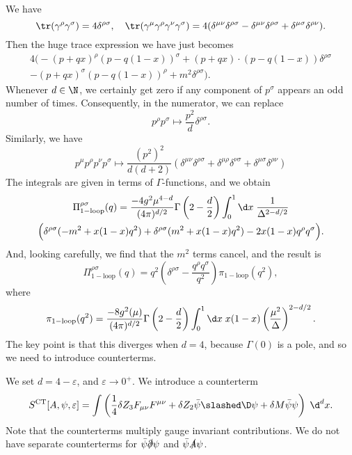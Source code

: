\documentclass[a4paper]{article}
\begin{document}
We have
\[
  \tr(\gamma^\rho \gamma^\sigma) = 4 \delta^{\rho\sigma},\quad \tr (\gamma^\mu \gamma^\rho \gamma^\nu \gamma^\sigma) = 4 (\delta^{\mu\nu}\delta^{\rho\sigma} - \delta^{\mu\nu} \delta^{\rho\sigma} + \delta^{\mu\sigma}\delta^{\rho\nu}).
\]
Then the huge trace expression we have just becomes
\begin{multline*}
  4\Big(-(p + qx)^\rho (p - q(1 - x))^\sigma + (p + qx) \cdot (p - q (1 - x)) \delta^{\rho\sigma} \\
  - (p + qx)^\sigma(p - q(1 - x))^\rho + m^2 \delta^{\rho\sigma}\Big).
\end{multline*}
Whenever $d \in \N$, we certainly get zero if any component of $p^\sigma$ appears an odd number of times. Consequently, in the numerator, we can replace
\[
  p^\rho p^\sigma \mapsto \frac{p^2}{d} \delta^{\rho\sigma}.
\]
Similarly, we have
\[
  p^\mu p^\rho p^\nu p^\sigma \mapsto \frac{(p^2)^2}{d(d + 2)} (\delta^{\mu\nu} \delta^{\rho\sigma} + \delta^{\mu\rho} \delta^{\nu\sigma} + \delta^{\mu\sigma}\delta^{\rho\nu})
\]
The integrals are given in terms of $\Gamma$-functions, and we obtain
\begin{multline*}
  \Pi^{\rho\sigma}_{\mathrm{1-loop}}(q) = \frac{-4g^2 \mu^{4 - d}}{(4\pi)^{d/2}} \Gamma\left(2 - \frac{d}{2}\right) \int_0^1 \d x\;\frac{1}{\Delta^{2 - d/2}}\\
  \Big(\delta^{\rho\sigma} (-m^2 + x(1 - x)q^2) + \delta^{\rho\sigma}(m^2 + x(1 - x)q^2) - 2x(1 - x) q^\rho q^\sigma\Big).
\end{multline*}
And, looking carefully, we find that the $m^2$ terms cancel, and the result is
\[
  \Pi_{\mathrm{1-loop}}^{\rho\sigma}(q) = q^2 \left(\delta^{\rho\sigma} - \frac{q^\rho q^\sigma}{q^2}\right) \pi_{\mathrm{1-loop}}(q^2),
\]
where
\[
  \pi_{\mathrm{1-loop}}(q^2) = \frac{-8 g^2(\mu)}{(4\pi)^{d/2}} \Gamma\left(2 - \frac{d}{2}\right) \int_0^1 \d x\; x(1 - x) \left(\frac{\mu^2}{\Delta}\right)^{2 - d/2}.
\]
The key point is that this diverges when $d = 4$, because $\Gamma(0)$ is a pole, and so we need to introduce counterterms.

We set $d = 4 - \varepsilon$, and $\varepsilon \to 0^+$. We introduce a counterterm
\[
  S^{\mathrm{CT}}[A, \psi, \varepsilon] = \int \left(\frac{1}{4} \delta Z_3 F_{\mu\nu}F^{\mu\nu} + \delta Z_2 \bar\psi \slashed\D \psi + \delta M \bar\psi \psi\right)\;\d^d x.
\]
Note that the counterterms multiply gauge invariant contributions. We do not have separate counterterms for $\bar{\psi} \slashed\partial \psi$ and $\bar\psi \slashed{A} \psi$.
\end{document}
